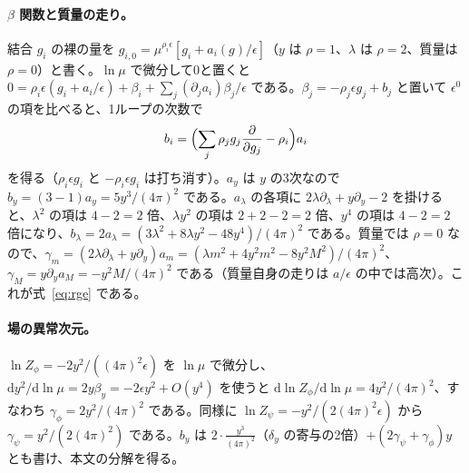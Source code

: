 \documentclass[a4paper,10pt]{ltjsarticle}
\newcommand{\dd}{\mathrm{d}}
\begin{document}
\paragraph{$\beta$ 関数と質量の走り。}結合 $g_i$ の裸の量を $g_{i,0}=\mu^{\rho_i\epsilon}[g_i+a_i(g)/\epsilon]$（$y$ は $\rho=1$、$\lambda$ は $\rho=2$、質量は $\rho=0$）と書く。$\ln\mu$ で微分して0と置くと $0=\rho_i\epsilon(g_i+a_i/\epsilon)+\beta_i+\sum_j(\partial_ja_i)\beta_j/\epsilon$ である。$\beta_j=-\rho_j\epsilon g_j+b_j$ と置いて $\epsilon^0$ の項を比べると、1ループの次数で
\begin{equation*}
b_i=\Bigl(\sum_j\rho_jg_j\frac{\partial}{\partial g_j}-\rho_i\Bigr)a_i
\end{equation*}
を得る（$\rho_i\epsilon g_i$ と $-\rho_i\epsilon g_i$ は打ち消す）。$a_y$ は $y$ の3次なので $b_y=(3-1)a_y=5y^3/(4\pi)^2$ である。$a_\lambda$ の各項に $2\lambda\partial_\lambda+y\partial_y-2$ を掛けると、$\lambda^2$ の項は $4-2=2$ 倍、$\lambda y^2$ の項は $2+2-2=2$ 倍、$y^4$ の項は $4-2=2$ 倍になり、$b_\lambda=2a_\lambda=(3\lambda^2+8\lambda y^2-48y^4)/(4\pi)^2$ である。質量では $\rho=0$ なので、$\gamma_m=(2\lambda\partial_\lambda+y\partial_y)a_m=(\lambda m^2+4y^2m^2-8y^2M^2)/(4\pi)^2$、$\gamma_M=y\partial_ya_M=-y^2M/(4\pi)^2$ である（質量自身の走りは $a/\epsilon$ の中では高次）。これが式~\eqref{eq:rge} である。

\paragraph{場の異常次元。}$\ln Z_\phi=-2y^2/((4\pi)^2\epsilon)$ を $\ln\mu$ で微分し、$\dd y^2/\dd\ln\mu=2y\beta_y=-2\epsilon y^2+O(y^4)$ を使うと $\dd\ln Z_\phi/\dd\ln\mu=4y^2/(4\pi)^2$、すなわち $\gamma_\phi=2y^2/(4\pi)^2$ である。同様に $\ln Z_\psi=-y^2/(2(4\pi)^2\epsilon)$ から $\gamma_\psi=y^2/(2(4\pi)^2)$ である。$b_y$ は $2\cdot\frac{y^3}{(4\pi)^2}$（$\delta_y$ の寄与の2倍）$+(2\gamma_\psi+\gamma_\phi)y$ とも書け、本文の分解を得る。
\end{document}
